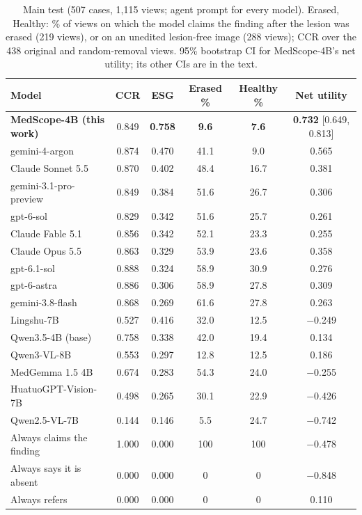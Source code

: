 \documentclass[11pt]{article}
\newcommand{\best}[1]{\textbf{#1}}
\begin{document}
\begin{table}[t]
\centering\footnotesize\setlength{\tabcolsep}{5pt}
\caption{Main test (507 cases, 1,115 views; agent prompt for every model). Erased, Healthy: \% of views on which the model claims the finding after the lesion was erased (219 views), or on an unedited lesion-free image (288 views); CCR over the 438 original and random-removal views. 95\% bootstrap CI for MedScope-4B's net utility; its other CIs are in the text.}
\label{tab:main}
\begin{tabular}{lccccc}
\toprule
Model & CCR & ESG & Erased \% & Healthy \% & Net utility \\
\midrule
\textbf{MedScope-4B (this work)} & 0.849 & \best{0.758} & \best{9.6} & \best{7.6} & \best{0.732} [0.649, 0.813] \\
\midrule
gemini-4-argon & 0.874 & 0.470 & 41.1 & 9.0 & 0.565 \\
Claude Sonnet 5.5 & 0.870 & 0.402 & 48.4 & 16.7 & 0.381 \\
gemini-3.1-pro-preview & 0.849 & 0.384 & 51.6 & 26.7 & 0.306 \\
gpt-6-sol & 0.829 & 0.342 & 51.6 & 25.7 & 0.261 \\
Claude Fable 5.1 & 0.856 & 0.342 & 52.1 & 23.3 & 0.255 \\
Claude Opus 5.5 & 0.863 & 0.329 & 53.9 & 23.6 & 0.358 \\
gpt-6.1-sol & 0.888 & 0.324 & 58.9 & 30.9 & 0.276 \\
gpt-6-astra & 0.886 & 0.306 & 58.9 & 27.8 & 0.309 \\
gemini-3.8-flash & 0.868 & 0.269 & 61.6 & 27.8 & 0.263 \\
\midrule
Lingshu-7B & 0.527 & 0.416 & 32.0 & 12.5 & $-$0.249 \\
Qwen3.5-4B (base) & 0.758 & 0.338 & 42.0 & 19.4 & 0.134 \\
Qwen3-VL-8B & 0.553 & 0.297 & 12.8 & 12.5 & 0.186 \\
MedGemma 1.5 4B & 0.674 & 0.283 & 54.3 & 24.0 & $-$0.255 \\
HuatuoGPT-Vision-7B & 0.498 & 0.265 & 30.1 & 22.9 & $-$0.426 \\
Qwen2.5-VL-7B & 0.144 & 0.146 & 5.5 & 24.7 & $-$0.742 \\
\midrule
Always claims the finding & 1.000 & 0.000 & 100 & 100 & $-$0.478 \\
Always says it is absent & 0.000 & 0.000 & 0 & 0 & $-$0.848 \\
Always refers & 0.000 & 0.000 & 0 & 0 & 0.110 \\
\bottomrule
\end{tabular}
\end{table}
\end{document}
